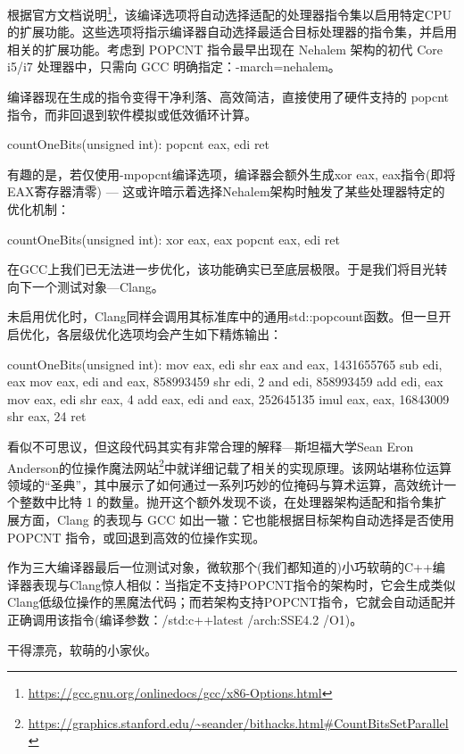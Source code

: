根据官方文档说明\footnote{\url{https://gcc.gnu.org/onlinedocs/gcc/x86-Options.html}}，该编译选项将自动选择适配的处理器指令集以启用特定CPU的扩展功能。这些选项将指示编译器自动选择最适合目标处理器的指令集，并启用相关的扩展功能。考虑到 POPCNT 指令最早出现在 Nehalem 架构的初代 Core i5/i7 处理器中，只需向 GCC 明确指定：-march=nehalem。

编译器现在生成的指令变得干净利落、高效简洁，直接使用了硬件支持的 popcnt 指令，而非回退到软件模拟或低效循环计算。

\begin{shell}
countOneBits(unsigned int):
  popcnt eax, edi
  ret
\end{shell}

有趣的是，若仅使用-mpopcnt编译选项，编译器会额外生成xor eax, eax指令(即将EAX寄存器清零) --- 这或许暗示着选择Nehalem架构时触发了某些处理器特定的优化机制：

\begin{shell}
countOneBits(unsigned int):
  xor eax, eax
  popcnt eax, edi
  ret
\end{shell}

在GCC上我们已无法进一步优化，该功能确实已至底层极限。于是我们将目光转向下一个测试对象---Clang。

未启用优化时，Clang同样会调用其标准库中的通用std::popcount函数。但一旦开启优化，各层级优化选项均会产生如下精炼输出：

\begin{shell}
countOneBits(unsigned int):
  mov eax, edi
  shr eax
  and eax, 1431655765
  sub edi, eax
  mov eax, edi
  and eax, 858993459
  shr edi, 2
  and edi, 858993459
  add edi, eax
  mov eax, edi
  shr eax, 4
  add eax, edi
  and eax, 252645135
  imul eax, eax, 16843009
  shr eax, 24
  ret
\end{shell}

看似不可思议，但这段代码其实有非常合理的解释---斯坦福大学Sean Eron Anderson的位操作魔法网站\footnote{\url{https://graphics.stanford.edu/~seander/bithacks.html\#CountBitsSetParallel}}中就详细记载了相关的实现原理。该网站堪称位运算领域的“圣典”，其中展示了如何通过一系列巧妙的位掩码与算术运算，高效统计一个整数中比特 1 的数量。抛开这个额外发现不谈，在处理器架构适配和指令集扩展方面，Clang 的表现与 GCC 如出一辙：它也能根据目标架构自动选择是否使用 POPCNT 指令，或回退到高效的位操作实现。

作为三大编译器最后一位测试对象，微软那个(我们都知道的)小巧软萌的C++编译器表现与Clang惊人相似：当指定不支持POPCNT指令的架构时，它会生成类似Clang低级位操作的黑魔法代码；而若架构支持POPCNT指令，它就会自动适配并正确调用该指令(编译参数：/std:c++latest /arch:SSE4.2 /O1)。

干得漂亮，软萌的小家伙。


























